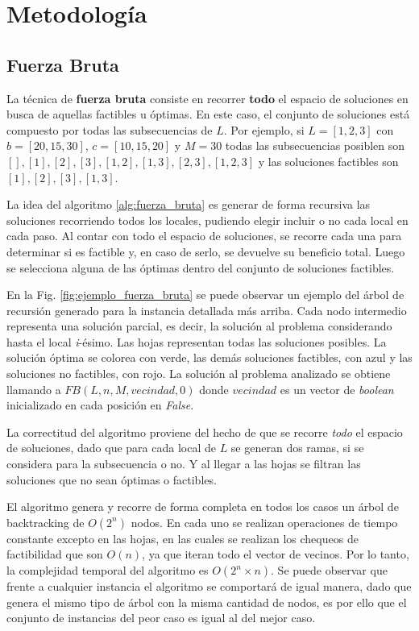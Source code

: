 \section{Metodología}\label{metodologia}

\subsection{Fuerza Bruta}

La técnica de \textbf{fuerza bruta} consiste en recorrer \textbf{todo} el espacio de soluciones en busca de aquellas factibles u óptimas. En este caso, el conjunto de soluciones está compuesto por todas las subsecuencias de $L$. Por ejemplo, si $L=[1,2,3]$ con $b=[20,15,30]$, $c=[10, 15, 20]$ y $M=30$ todas las subsecuencias posiblen son $[], [1], [2], [3], [1,2], [1,3], [2,3], [1,2,3]$ y las soluciones factibles son $[1], [2], [3], [1,3]$.

La idea del algoritmo \ref{alg:fuerza_bruta} es generar de forma recursiva las soluciones recorriendo todos los locales, pudiendo elegir incluir o no cada local en cada paso. Al contar con todo el espacio de soluciones, se recorre cada una para determinar si es factible y, en caso de serlo, se devuelve su beneficio total. Luego se selecciona alguna de las óptimas dentro del conjunto de soluciones factibles.

En la Fig. \ref{fig:ejemplo_fuerza_bruta} se puede observar un ejemplo del árbol de recursión generado para la instancia detallada más arriba. Cada nodo intermedio representa una solución parcial, es decir, la solución al problema considerando hasta el local \textit{i}-ésimo. Las hojas representan todas las soluciones posibles. La solución óptima se colorea con verde, las demás soluciones factibles, con azul y las soluciones no factibles, con rojo. La solución al problema analizado se obtiene llamando a $FB(L, n, M, vecindad, 0)$ donde $vecindad$ es un vector de \textit{boolean} inicializado en cada posición en \textit{False}.

La correctitud del algoritmo proviene del hecho de que se recorre \textit{todo} el espacio de soluciones, dado que para cada local de $L$ se generan dos ramas, si se considera para la subsecuencia o no. Y al llegar a las hojas se filtran las soluciones que no sean óptimas o factibles.

El algoritmo genera y recorre de forma completa en todos los casos un árbol de backtracking de $O(2^n)$ nodos. En cada uno se realizan operaciones de tiempo constante excepto en las hojas, en las cuales se realizan los chequeos de factibilidad que son $O(n)$, ya que iteran todo el vector de vecinos. Por lo tanto, la complejidad temporal del algoritmo es $O(2^n \times n)$. Se puede observar que frente a cualquier instancia el algoritmo se comportará de igual manera, dado que genera el mismo tipo de árbol con la misma cantidad de nodos, es por ello que el conjunto de instancias del peor caso es igual al del mejor caso.


